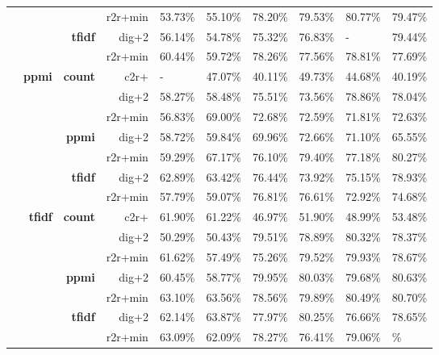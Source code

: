 \begin{table}
{\begin{tabular}{rrrrllllll}
	 &  &  & {r2r+min} & 53.73\% & 55.10\% & 78.20\% & 79.53\% & 80.77\% & 79.47\% \\
	\cline{3-4}
	 &  & \multirow[t]{2}{*}{\textbf{tfidf}} & {dig+2} & 56.14\% & 54.78\% & 75.32\% & 76.83\% & - & 79.44\% \\
	 &  &  & {r2r+min} & 60.44\% & 59.72\% & 78.26\% & 77.56\% & 78.81\% & 77.69\% \\
	\cline{1-4} \cline{2-4} \cline{3-4}
	\multirow[t]{14}{*}{\textbf{\Smfauhtcsldp}} & \multirow[t]{7}{*}{\textbf{ppmi}} & \multirow[t]{3}{*}{\textbf{count}} & {c2r+} & - & 47.07\% & 40.11\% & 49.73\% & 44.68\% & 40.19\% \\
	 &  &  & {dig+2} & 58.27\% & 58.48\% & 75.51\% & 73.56\% & 78.86\% & 78.04\% \\
	 &  &  & {r2r+min} & 56.83\% & 69.00\% & 72.68\% & 72.59\% & 71.81\% & 72.63\% \\
	\cline{3-4}
	 &  & \multirow[t]{2}{*}{\textbf{ppmi}} & {dig+2} & 58.72\% & 59.84\% & 69.96\% & 72.66\% & 71.10\% & 65.55\% \\
	 &  &  & {r2r+min} & 59.29\% & 67.17\% & 76.10\% & 79.40\% & 77.18\% & 80.27\% \\
	\cline{3-4}
	 &  & \multirow[t]{2}{*}{\textbf{tfidf}} & {dig+2} & 62.89\% & 63.42\% & 76.44\% & 73.92\% & 75.15\% & 78.93\% \\
	 &  &  & {r2r+min} & 57.79\% & 59.07\% & 76.81\% & 76.61\% & 72.92\% & 74.68\% \\
	\cline{2-4} \cline{3-4}
	 & \multirow[t]{7}{*}{\textbf{tfidf}} & \multirow[t]{3}{*}{\textbf{count}} & {c2r+} & 61.90\% & 61.22\% & 46.97\% & 51.90\% & 48.99\% & 53.48\% \\
	 &  &  & {dig+2} & 50.29\% & 50.43\% & 79.51\% & 78.89\% & 80.32\% & 78.37\% \\
	 &  &  & {r2r+min} & 61.62\% & 57.49\% & 75.26\% & 79.52\% & 79.93\% & 78.67\% \\
	\cline{3-4}
	 &  & \multirow[t]{2}{*}{\textbf{ppmi}} & {dig+2} & 60.45\% & 58.77\% & 79.95\% & 80.03\% & 79.68\% & 80.63\% \\
	 &  &  & {r2r+min} & 63.10\% & 63.56\% & 78.56\% & 79.89\% & 80.49\% & 80.70\% \\
	\cline{3-4}
	 &  & \multirow[t]{2}{*}{\textbf{tfidf}} & {dig+2} & 62.14\% & 63.87\% & 77.97\% & 80.25\% & 76.66\% & 78.65\% \\
	 &  &  & {r2r+min} & 63.09\% & 62.09\% & 78.27\% & 76.41\% & 79.06\% & \bst 80.92\% \\
	\bottomrule
	\end{tabular}
	}
\end{table}





